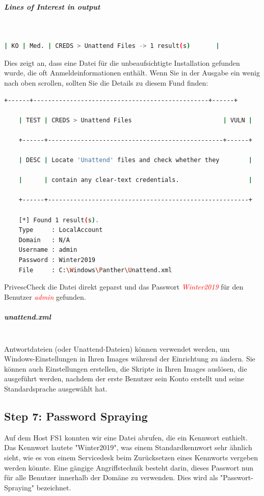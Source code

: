 \subparagraph{Lines of Interest in output}\mbox{} \\

\begin{lstlisting}[language=bash]
    | KO | Med. | CREDS > Unattend Files -> 1 result(s)       |
\end{lstlisting}

Dies zeigt an, dass eine Datei für die unbeaufsichtigte Installation gefunden wurde, die oft Anmeldeinformationen enthält. Wenn Sie in der Ausgabe ein wenig nach oben scrollen, sollten Sie die Details zu diesem Fund finden:

\begin{lstlisting}[language=bash]
    +------+------------------------------------------------+------+

    | TEST | CREDS > Unattend Files                         | VULN |

    +------+------------------------------------------------+------+

    | DESC | Locate 'Unattend' files and check whether they        |

    |      | contain any clear-text credentials.                   |

    +------+-------------------------------------------------------+

    [*] Found 1 result(s).
    Type     : LocalAccount
    Domain   : N/A
    Username : admin
    Password : Winter2019
    File     : C:\Windows\Panther\Unattend.xml
\end{lstlisting}

PrivescCheck die Datei direkt geparst und das Passwort \textcolor{red}{\textit{Winter2019}} für den Benutzer \textcolor{red}{\textit{admin}} gefunden.

\subparagraph{unattend.xml}\mbox{} \\
Antwortdateien (oder Unattend-Dateien) können verwendet werden, um Windows-Einstellungen in Ihren Images während der Einrichtung zu ändern. Sie können auch Einstellungen erstellen, die Skripte in Ihren Images auslösen, die ausgeführt werden, nachdem der erste Benutzer sein Konto erstellt und seine Standardsprache ausgewählt hat.



\subsection{Step 7: Password Spraying}
Auf dem Host FS1 konnten wir eine Datei abrufen, die ein Kennwort enthielt. Das Kennwort lautete "Winter2019", was einem Standardkennwort sehr ähnlich sieht, wie es von einem Servicedesk beim Zurücksetzen eines Kennworts vergeben werden könnte.
Eine gängige Angriffstechnik besteht darin, dieses Passwort nun für alle Benutzer innerhalb der Domäne zu verwenden. Dies wird als "Passwort-Spraying" bezeichnet.

